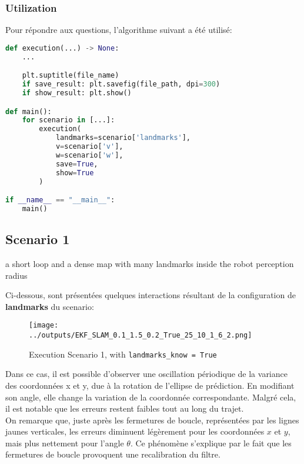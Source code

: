 \documentclass[../CSC_5RO12_TA_TP4.tex]{subfiles}
\begin{document}
\subsubsection{Utilization}
\noindent Pour répondre aux questions, l'algorithme suivant a été utilisé:
\begin{scriptsize}\mycode
	\begin{lstlisting}[language=Python]
def execution(...) -> None:
    ...

    plt.suptitle(file_name)
    if save_result: plt.savefig(file_path, dpi=300)
    if show_result: plt.show()

def main():
    for scenario in [...]:
        execution(
            landmarks=scenario['landmarks'],
            v=scenario['v'],
            w=scenario['w'],
            save=True,
            show=True
        )

if __name__ == "__main__":
    main()
	\end{lstlisting}
\end{scriptsize}


\subsection{Scenario 1}
\begin{definition}
    a short loop and a dense map with many landmarks inside the robot perception radius
\end{definition}
\noindent Ci-dessous, sont présentées quelques interactions résultant de la configuration de \textbf{landmarks} du scenario:
\begin{figure}[H]
    \centering
	\texttt{[image: ../outputs/EKF\_SLAM\_0.1\_1.5\_0.2\_True\_25\_10\_1\_6\_2.png]}
	\caption{Execution Scenario 1, with \texttt{landmarks\_know = True}}
	\label{}
\end{figure}
\noindent Dans ce cas, il est possible d'observer une oscillation périodique de la variance des coordonnées x et y, due à la rotation de l'ellipse de prédiction. En modifiant son angle, elle change la variation de la coordonnée correspondante. Malgré cela, il est notable que les erreurs restent faibles tout au long du trajet.\\

\noindent On remarque que, juste après les fermetures de boucle, représentées par les lignes jaunes verticales, les erreurs diminuent légèrement pour les coordonnées $x$ et $y$, mais plus nettement pour l'angle $\theta$. Ce phénomène s'explique par le fait que les fermetures de boucle provoquent une recalibration du filtre.\\
\end{document}
